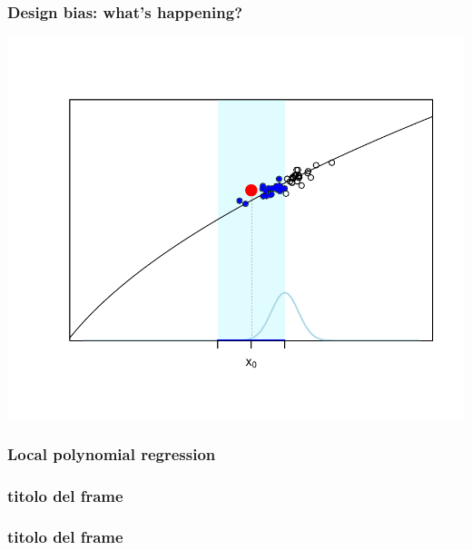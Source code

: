 \documentclass[pdf]{beamer}\usepackage[]{graphicx}\usepackage[]{color}
\newenvironment{knitrout}{}{} %
\begin{document}
\begin{frame}
\frametitle{Design bias: what's happening?}

\begin{knitrout}
\color{fgcolor}

{\centering \includegraphics[width=\textwidth]{figure/designBias-1} 

}



\end{knitrout}

\end{frame}



\begin{frame}
\frametitle{Local polynomial regression}


\end{frame}

\begin{frame}
\frametitle{titolo del frame}


\end{frame}

\begin{frame}
\frametitle{titolo del frame}


\end{frame}
\end{document}
